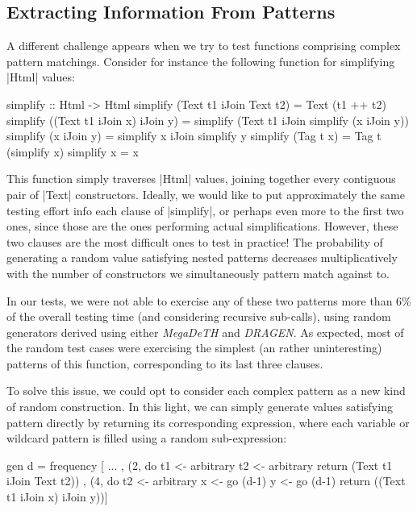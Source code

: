 %
\subsection{Extracting Information From Patterns}

A different challenge appears when we try to test functions comprising complex
pattern matchings. Consider for instance the following function for simplifying
|Html| values:

\begin{code}
simplify :: Html -> Html
simplify (Text t1 iJoin Text t2) = Text (t1 ++ t2)
simplify ((Text t1 iJoin x) iJoin y)
  = simplify (Text t1 iJoin simplify (x iJoin y))
simplify (x iJoin y) = simplify x iJoin simplify y
simplify (Tag t x) = Tag t (simplify x)
simplify x = x
\end{code}
%
This function simply traverses |Html| values, joining together every contiguous
pair of |Text| constructors.
%
Ideally, we would like to put approximately the same testing effort info each
clause of |simplify|, or perhaps even more to the first two ones, since those
are the ones performing actual simplifications.
%
However, these two clauses are the most difficult ones to test in practice!
%
The probability of generating a random value satisfying nested patterns
decreases multiplicatively with the number of constructors we simultaneously
pattern match against to.


In our tests, we were not able to exercise any of these two patterns more than
6\% of the overall testing time (and considering recursive sub-calls), using
random generators derived using either \emph{MegaDeTH} and \emph{DRAGEN}.
%
As expected, most of the random test cases were exercising the simplest (an
rather uninteresting) patterns of this function, corresponding to its last three
clauses.


To solve this issue, we could opt to consider each complex pattern as a new kind
of random construction.
%
In this light, we can simply generate values satisfying pattern directly by
returning its corresponding expression, where each variable or wildcard pattern
is filled using a random sub-expression:

\begin{code}
  gen d = frequency
    [ ...
    , (2, do  t1  <- arbitrary
              t2  <- arbitrary
              return (Text t1 iJoin Text t2))
    , (4, do  t2  <- arbitrary
              x   <- go (d-1)
              y   <- go (d-1)
              return ((Text t1 iJoin x) iJoin y))]
\end{code}%



